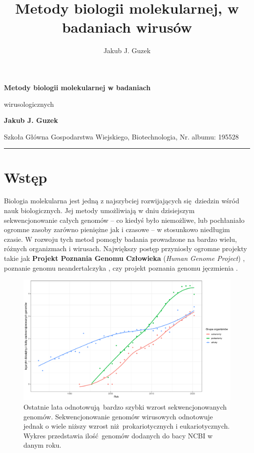 \documentclass[two column, twoside, a4paper]{article}
\title{Metody biologii molekularnej, w badaniach wirusów}
\author{Jakub J. Guzek}
\date{}
\begin{document}
\begin{strip}
{\sc \bfseries \huge {}\selectfont Metody biologii molekularnej w badaniach

\vspace{3pt} wirusologicznych} \vspace{\baselineskip}

{\bfseries \Large Jakub J. Guzek}

{Szkoła Główna Gospodarstwa Wiejskiego, Biotechnologia, Nr. albumu: 195528}\vspace{\baselineskip}

\hrule
\end{strip}

\section{Wstęp}

Biologia molekularna jest jedną z najszybciej rozwijających się dziedzin wśród nauk biologicznych. Jej metody umożliwiają w dniu dzisiejszym sekwencjonowanie całych genomów -- co kiedyś było niemożliwe, lub pochłaniało ogromne zasoby zarówno pieniężne jak i czasowe -- w stosunkowo niedługim czasie. W rozwoju tych metod pomogły badania prowadzone na bardzo wielu, różnych organizmach i wirusach. Największy postęp przyniosły ogromne projekty takie jak \textbf{Projekt Poznania Genomu Człowieka} (\textit{Human Genome Project}) \autocite{IHGSC2001}, poznanie genomu neandertalczyka \autocite{Prufer2014}, czy projekt poznania genomu jęczmienia \autocite{IBGSC2012}.

\begin{figure}[h]
\begin{tcolorbox}
	\centering
	\includegraphics[width=\textwidth]{./sequenced_genomes.pdf}
	\caption{Ostatnie lata odnotowują bardzo szybki wzrost sekwencjonowanych genomów. Sekwencjonowanie genomów wirusowych odnotowuje jednak o wiele niższy wzrost niż prokariotycznych i eukariotycznych. Wykres przedstawia ilość genomów dodanych do bacy NCBI \autocite{NCBI} w danym roku.}\label{fig::seq_trends}

\end{tcolorbox}
\end{figure}
\end{document}
